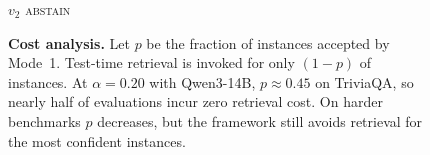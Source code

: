 \begin{figure}[t]
\begin{minipage}[t]{0.45\textwidth}
\begin{algorithm}[H]
\begin{algorithmic}[1]
    \State \Return $v_2$ 
\EndIf
\Statex
\State \Return \textsc{abstain} 
\end{algorithmic}
\end{algorithm}
\vspace{0.5em}
\small
\textbf{Cost analysis.} Let $p$ be the fraction of instances accepted by Mode~1. Test-time retrieval is invoked for only $(1\!-\!p)$ of instances. At $\alpha\!=\!0.20$ with Qwen3-14B, $p\!\approx\!0.45$ on TriviaQA, so nearly half of evaluations incur zero retrieval cost. On harder benchmarks $p$ decreases, but the framework still avoids retrieval for the most confident instances.
\end{minipage}
\end{figure}
